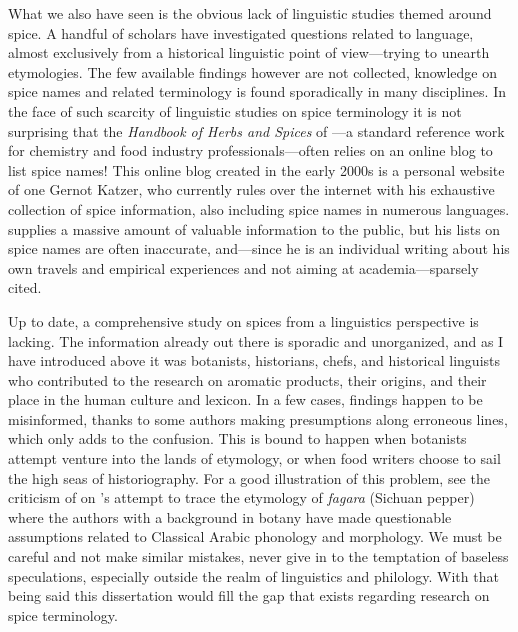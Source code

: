 What we also have seen is the obvious lack of linguistic studies themed around spice. A handful of scholars have investigated questions related to language, almost exclusively from a historical linguistic point of view---trying to unearth etymologies. The few available findings however are not collected, knowledge on spice names and related terminology is found sporadically in many disciplines. In the face of such scarcity of linguistic studies on spice terminology it is not surprising that the \textit{Handbook of Herbs and Spices} of \textcite{peter_handbook_2012}---a standard reference work for chemistry and food industry professionals---often relies on an online blog to list spice names! This online blog created in the early 2000s is a personal website of one Gernot Katzer, who currently rules over the internet with his exhaustive collection of spice information, also including spice names in numerous languages. \textcite{katzer_welcome_2012} supplies a massive amount of valuable information to the public, but his lists on spice names are often inaccurate, and---since he is an individual writing about his own travels and empirical experiences and not aiming at academia---sparsely cited.

Up to date, a comprehensive study on spices from a linguistics perspective is lacking. The information already out there is sporadic and unorganized, and as I have introduced above it was botanists, historians, chefs, and historical linguists who contributed to the research on aromatic products, their origins, and their place in the human culture and lexicon. In a few cases, findings happen to be misinformed, thanks to some authors making presumptions along erroneous lines, which only adds to the confusion. This is bound to happen when botanists attempt venture into the lands of etymology, or when food writers choose to sail the high seas of historiography. For a good illustration of this problem, see the criticism of \textcite{haw_cinnamon_2017} on \textcite{austin_sichuan_2008}'s attempt to trace the etymology of \textit{fagara} (Sichuan pepper) where the authors with a background in botany have made questionable assumptions related to Classical Arabic phonology and morphology. We must be careful and not make similar mistakes, never give in to the temptation of baseless speculations, especially outside the realm of linguistics and philology. With that being said this dissertation would fill the gap that exists regarding research on spice terminology. 


